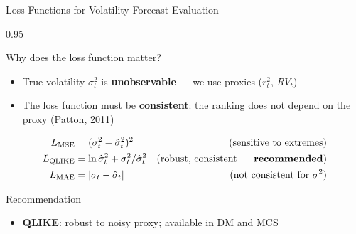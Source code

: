 \documentclass[9pt, aspectratio=169, t]{beamer}
\begin{document}
\begin{frame}{Loss Functions for Volatility Forecast Evaluation}
    \begin{cminipage}{0.95\textwidth}
    {\footnotesize
    \begin{block}{Why does the loss function matter?}
        \begin{itemize}\setlength{\itemsep}{0pt}
            \item True volatility $\sigma_t^2$ is \textbf{unobservable} --- we use proxies ($r_t^2$, $RV_t$)
            \item The loss function must be \textbf{consistent}: the ranking does not depend on the proxy (Patton, 2011)
        \end{itemize}
    \end{block}
    \vspace{-2mm}
    \begin{defn}
        \vspace{-3mm}
        \begin{align*}
            L_{\text{MSE}} &= (\sigma_t^2 - \hat{\sigma}_t^2)^2 & \text{(sensitive to extremes)}\\
            L_{\text{QLIKE}} &= \ln \hat{\sigma}_t^2 + \sigma_t^2 / \hat{\sigma}_t^2 & \text{(robust, consistent --- \textbf{recommended})}\\
            L_{\text{MAE}} &= |\sigma_t - \hat{\sigma}_t| & \text{(not consistent for $\sigma^2$)}
        \end{align*}
    \end{defn}
    \vspace{-1mm}
    \begin{alertblock}{Recommendation}
        \begin{itemize}\setlength{\itemsep}{0pt}
            \item \textbf{QLIKE}: robust to noisy proxy; available in DM and MCS
        \end{itemize}
    \end{alertblock}
    }
    \end{cminipage}
\end{frame}
\end{document}
